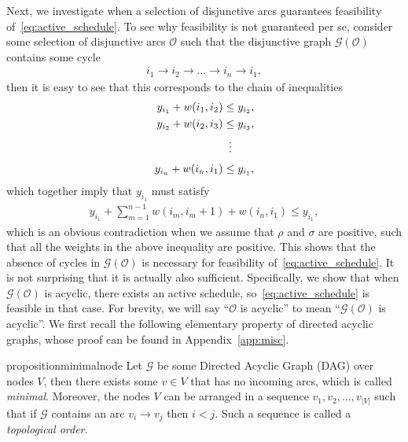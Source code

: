 \documentclass{report}
\theoremstyle{definition}
\theoremstyle{plain}
\begin{document}
Next, we investigate when a selection of disjunctive arcs guarantees
feasibility of~\eqref{eq:active_schedule}.
%
To see why feasibility is not guaranteed per se, consider some selection of
disjunctive arcs $\mathcal{O}$ such that the disjunctive graph $\mathcal{G}(\mathcal{O})$
contains some cycle
\begin{align*}
 i_1 \rightarrow i_2 \rightarrow \dots \rightarrow i_n \rightarrow i_1,
\end{align*}
%
then it is easy to see that this corresponds to the chain of inequalities
\begin{align*}
  y_{i_1} + w(i_1,i_2) &\leq y_{i_2} ,\\
  y_{i_2} + w(i_2,i_3) &\leq y_{i_3} ,\\
  &\vdotswithin{=} \notag \\[0.3em]
  y_{i_n} + w(i_n,i_1) &\leq y_{i_1} ,
\end{align*}
%
which together imply that $y_{i_1}$ must satisfy
\begin{align*}
  y_{i_1} + \sum_{m=1}^{n-1} w(i_m, i_m+1) + w(i_n, i_1) \leq y_{i_1} ,
\end{align*}
which is an obvious contradiction when we assume that $\rho$
and $\sigma$ are positive, such that all the weights in the above
inequality are positive.
%
This shows that the absence of cycles in $\mathcal{G}(\mathcal{O})$ is necessary
for feasibility of~\eqref{eq:active_schedule}. It is not surprising that it is actually also
sufficient.
%
Specifically, we show that when $\mathcal{G}(\mathcal{O})$ is acyclic, there exists an
active schedule, so~\eqref{eq:active_schedule} is feasible in that case.
%
For brevity, we will say ``$\mathcal{O}$ is acyclic'' to mean ``$\mathcal{G}(\mathcal{O})$
is acyclic''.
%
We first recall the following elementary property of directed acyclic graphs,
whose proof can be found in Appendix~\ref{app:misc}.

\begin{restatable}{proposition}{minimalnode}\label{lemma:minimal-node}
  Let $\mathcal{G}$ be some Directed Acyclic Graph (DAG) over nodes $V$, then
  there exists some $v \in V$ that has no incoming arcs, which is called
  \emph{minimal}. Moreover, the nodes $V$ can be arranged in a sequence
  $v_1, v_2, \dots, v_{|V|}$ such that if $\mathcal{G}$ contains an arc
  $v_i \rightarrow v_j$ then $i < j$. Such a sequence is called a
  \emph{topological order}.
\end{restatable}
\end{document}
